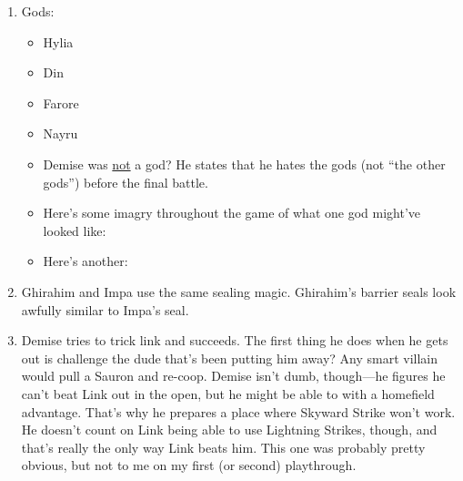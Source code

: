 \begin{enumerate}
	\item{Gods:
		\begin{itemize}
			\item{Hylia}
			\item{Din}
			\item{Farore}
			\item{Nayru}
			\item{Demise was \ul{not} a god? He states that he hates the gods (not ``the other gods'') before the final battle.}
			\item{Here's some imagry throughout the game of what one god might've looked like:
				}
			\item{Here's another:
				}
		\end{itemize}
	}
	\item{Ghirahim and Impa use the same sealing magic. Ghirahim's barrier seals look awfully similar to Impa's seal.
	}
	\item{Demise tries to trick link and succeeds. The first thing he does when he gets out is challenge the dude that's been putting him away? Any smart villain would pull a Sauron and re-coop. Demise isn't dumb, though---he figures he can't beat Link out in the open, but he might be able to with a homefield advantage. That's why he prepares a place where Skyward Strike won't work. He doesn't count on Link being able to use Lightning Strikes, though, and that's really the only way Link beats him. This one was probably pretty obvious, but not to me on my first (or second) playthrough.}
\end{enumerate}

